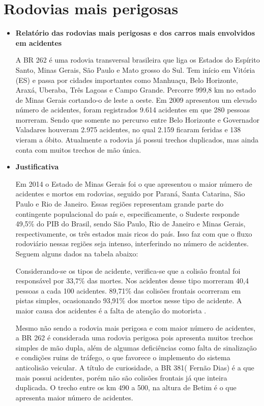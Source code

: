 \chapter[Rodovias mais perigosas]{Rodovias mais perigosas}

\begin{itemize}

\item \textbf{Relatório das rodovias mais perigosas e dos carros mais envolvidos em acidentes}

A BR 262 é uma rodovia transversal brasileira que liga os Estados do Espírito Santo, Minas Gerais, São Paulo e Mato grosso do Sul. Tem início em Vitória (ES) e passa por cidades importantes como Manhuaçu, Belo Horizonte, Araxá, Uberaba, Três Lagoas e Campo Grande. Percorre 999,8 km no estado de Minas Gerais cortando-o de leste a oeste. Em 2009 apresentou um elevado número de acidentes, foram registrados 9.614 acidentes em que 280 pessoas morreram. Sendo que somente no percurso entre Belo Horizonte e Governador Valadares houveram 2.975 acidentes, no qual 2.159 ficaram feridas e 138 vieram a óbito. Atualmente a rodovia já possui trechos duplicados, mas ainda conta com muitos trechos de mão única.

\item \textbf{Justificativa}

Em 2014 o Estado de Minas Gerais foi o que apresentou o maior número de acidentes e mortos em rodovias, seguido por Paraná, Santa Catarina, São Paulo e Rio de Janeiro. Essas regiões representam grande parte do contingente populacional do país e, especificamente, o Sudeste responde 49,5\% do PIB do Brasil, sendo São Paulo, Rio de Janeiro e Minas Gerais, respectivamente, os três estados mais ricos do país. Isso faz com que o fluxo rodoviário nessas regiões seja intenso, interferindo no número de acidentes. Seguem alguns dados na tabela abaixo:

Considerando-se os tipos de acidente, verifica-se que a colisão frontal foi responsável por 33,7\% das mortes. Nos acidentes desse tipo morreram 40,4 pessoas a cada 100 acidentes. 89,71\% das colisões frontais ocorreram em pistas simples, ocasionando 93,91\% dos mortos nesse tipo de acidente. A maior causa dos acidentes é a falta de atenção do motorista \cite{ipea2}.

Mesmo não sendo a rodovia mais perigosa e com maior número de acidentes, a BR 262 é considerada uma rodovia perigosa pois apresenta muitos trechos simples de mão dupla, além de algumas deficiências como falta de sinalização e condições ruins de tráfego, o que favorece o implemento do sistema anticolisão veicular. A título de curiosidade, a BR 381( Fernão Dias) é a que mais possui acidentes, porém não são colisões frontais já que inteira duplicada. O trecho entre os km 490 a 500, na altura de Betim é o que apresenta maior número de acidentes.


\end{itemize}
